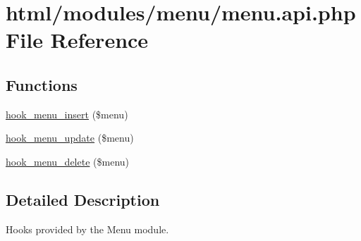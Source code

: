 \hypertarget{menu_8api_8php}{
\section{html/modules/menu/menu.api.php File Reference}
\label{menu_8api_8php}
}
\subsection*{Functions}
\begin{DoxyCompactItemize}
\item 
\hyperlink{group__hooks_ga8459a7c61564db3b5ccd53d39ada1555}{hook\_\-menu\_\-insert} (\$menu)
\item 
\hyperlink{group__hooks_ga21331911abfc25de5921af04a76a0921}{hook\_\-menu\_\-update} (\$menu)
\item 
\hyperlink{group__hooks_gaef8c43d600c4efbae913dc3841a93199}{hook\_\-menu\_\-delete} (\$menu)
\end{DoxyCompactItemize}


\subsection{Detailed Description}
Hooks provided by the Menu module. 